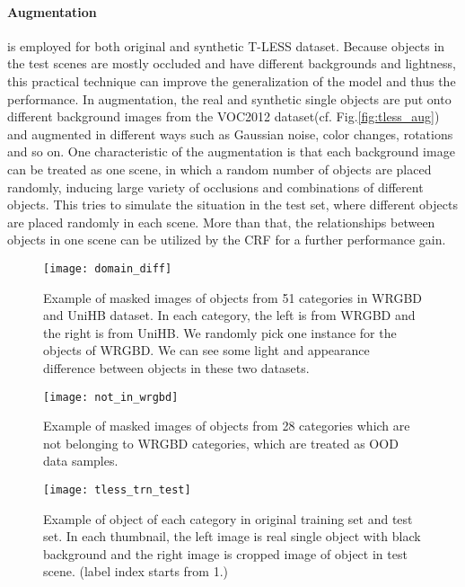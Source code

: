 \paragraph{Augmentation} is employed for both original and synthetic T-LESS dataset.
Because objects in the test scenes are mostly occluded and have different backgrounds and lightness, this practical technique can improve the generalization of the model and thus the performance.
In augmentation, the real and synthetic single objects are put onto different background images from the VOC2012 dataset\cite{pascal-voc-2012}(cf. Fig.\ref{fig:tless_aug}) and augmented in different ways such as Gaussian noise, color changes, rotations and so on.
One characteristic of the augmentation is that each background image can be treated as one scene, in which a random number of objects are placed randomly, inducing large variety of occlusions and combinations of different objects.
This tries to simulate the situation in the test set, where different objects are placed randomly in each scene.
More than that, the relationships between objects in one scene can be utilized by the CRF for a further performance gain.

 \begin{figure}[H]
 	\begin{center}
 		\texttt{[image: domain\_diff]}
 		\caption{Example of masked images of objects from 51 categories in WRGBD and UniHB dataset. In each category, the left is from WRGBD and the right is from UniHB. We randomly pick one instance for the objects of WRGBD. We can see some light and appearance difference between objects in these two datasets.}		
 		\label{fig:wrgbd2}
 	\end{center}
 \end{figure}

\begin{figure}[H]
	\begin{center}
		\texttt{[image: not\_in\_wrgbd]}
		\caption{Example of masked images of objects from 28 categories which are not belonging to WRGBD categories, which are treated as OOD data samples.}		
		\label{fig:not_in_wrgbd}
	\end{center}
\end{figure} 

\begin{figure}[H]
	\begin{center}
		\texttt{[image: tless\_trn\_test]}
		\caption{Example of object of each category in original training set and test set. In each thumbnail, the left image is real single object with black background and the right image is cropped image of object in test scene. (label index starts from 1.)}		
		\label{fig:tless_ori}
	\end{center}
\end{figure} 

